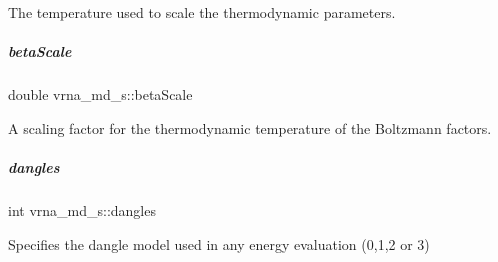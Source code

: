 The temperature used to scale the thermodynamic parameters. 

\mbox{\label{group__model__details_a19524bf1d8d7ab590ed36edbbcaaba2c}} 
\subparagraph{\texorpdfstring{beta\+Scale}{betaScale}}
{\footnotesize\ttfamily double vrna\+\_\+md\+\_\+s\+::beta\+Scale}



A scaling factor for the thermodynamic temperature of the Boltzmann factors. 

\mbox{\label{group__model__details_adcda4ff2ea77748ae0e8700288282efc}} 
\subparagraph{\texorpdfstring{dangles}{dangles}}
{\footnotesize\ttfamily int vrna\+\_\+md\+\_\+s\+::dangles}



Specifies the dangle model used in any energy evaluation (0,1,2 or 3) 

